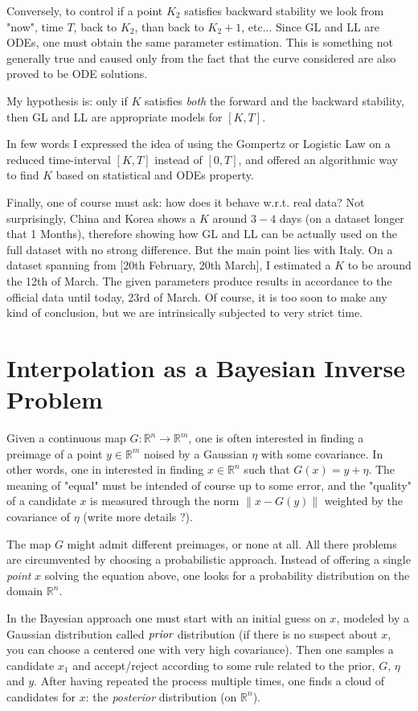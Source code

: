\documentclass[6pt]{article}
\newcommand{\norm}[1]{\left\lVert#1\right\rVert}
\begin{document}
Conversely, to control if a point $K_2$ satisfies backward stability we look from "now", time $T$, back to $K_2$, than back to $K_2 + 1$, etc...
Since GL and LL are ODEs, one must obtain the same parameter estimation. This is something not generally true and caused only from the fact
that the curve considered are also proved to be ODE solutions.

My hypothesis is: only if $K$ satisfies \emph{both} the forward and the backward stability, then GL and LL are appropriate models for $[K, T]$.

In few words I expressed the idea of using the Gompertz or Logistic Law on a reduced time-interval $[K, T]$ instead of
$[0, T]$, and offered an algorithmic way to find $K$ based on statistical and ODEs property.

Finally, one of course must ask: how does it behave w.r.t. real data?
Not surprisingly, China and Korea shows a $K$ around $3-4$ days (on a dataset longer that 1 Months), therefore showing how GL and LL
can be actually used on the full dataset with no strong difference. But the main point lies with Italy.
On a dataset spanning from [20th February, 20th March], I estimated a $K$ to be around the 12th of March. The given parameters produce results in accordance
to the official data until today, 23rd of March. Of course, it is too soon to make any kind of conclusion, but we are intrinsically subjected to very strict
time.

\section{Interpolation as a Bayesian Inverse Problem}
Given a continuous map $G: \mathbb{R}^n \to \mathbb{R}^m$, one is often interested in finding a preimage of a point $y \in \mathbb{R}^m$ noised by a Gaussian
$\eta$ with some covariance. In other words, one in interested in finding $x \in \mathbb{R}^n$ such that $G(x) = y + \eta$.
The meaning of "equal" must be intended of course up to some error, and the "quality" of a candidate $x$ is measured 
through the norm $\norm{x - G(y)}$ weighted by the covariance of $\eta$ (write more details ?).

The map $G$ might admit different preimages, or none at all. All there problems are circumvented by choosing a probabilistic approach.
Instead of offering a single \emph{point} $x$ solving the equation above, one looks for a probability distribution on the domain $\mathbb{R}^n$.

In the Bayesian approach one must start with an initial guess on $x$, modeled by a Gaussian distribution called $\emph{prior}$ distribution
(if there is no suspect about $x$, you can choose a centered one with very high covariance).
Then one samples a candidate $x_1$ and accept/reject according to some rule related to the prior, $G$, $\eta$ and $y$.
After having repeated the process multiple times, one finds
a cloud of candidates for $x$: the \emph{posterior} distribution (on $\mathbb{R}^n$).
\end{document}

